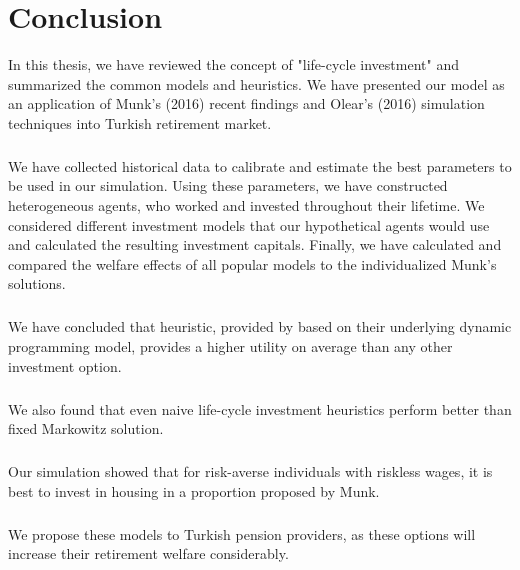 \chapter{Conclusion}
\label{conclusion}

In this thesis, we have reviewed the concept of "life-cycle investment" and summarized the common models and heuristics. We have presented our model as an application of Munk's (2016) recent findings and Olear's (2016) simulation techniques into Turkish retirement market.

\paragraph{}We have collected historical data to calibrate and estimate the best parameters to be used in our simulation. Using these parameters, we have constructed heterogeneous agents, who worked and invested throughout their lifetime. We considered different investment models that our hypothetical agents would use and calculated the resulting investment capitals. Finally, we have calculated and compared the welfare effects of all popular models to the individualized Munk's solutions.

\paragraph{}We have concluded that heuristic, provided by \citet{cocco} based on their underlying dynamic programming model, provides a higher utility on average than any other investment option.

\paragraph{}We also found that even naive life-cycle investment heuristics perform better than fixed Markowitz solution. 

\paragraph{}Our simulation showed that for risk-averse individuals with riskless wages, it is best to invest in housing in a proportion proposed by Munk.

\paragraph{}We propose these models to Turkish pension providers, as these options will increase their retirement welfare considerably.
